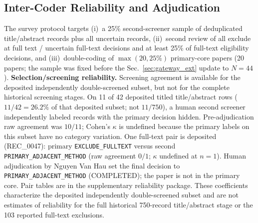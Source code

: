 \documentclass[lettersize,journal]{IEEEtran}
\begin{document}
\subsection{Inter-Coder Reliability and Adjudication}
\label{sec:icr}
The survey protocol targets (i)~a 25\% second-screener sample of deduplicated title/abstract records plus all uncertain records, (ii)~second review of all exclude at full text / uncertain full-text decisions and at least 25\% of full-text eligibility decisions, and (iii)~double-coding of $\max(20, 25\%)$ primary-core papers (20 papers; the sample was fixed before the Sec.~\ref{sec:gateway_ext} update to $N=44$).
\textbf{Selection/screening reliability.} Screening agreement is available for the deposited independently double-screened subset, but not for the complete historical screening stages. On 11 of 42 deposited titled title/abstract rows ($11/42=26.2\%$ of that deposited subset; not $11/750$), a human second screener independently labeled records with the primary decision hidden. Pre-adjudication raw agreement was $10/11$; Cohen's $\kappa$ is undefined because the primary labels on this subset have no category variation. One full-text pair is deposited (REC\_0047): primary \texttt{EXCLUDE\_FULLTEXT} versus second \texttt{PRIMARY\_ADJACENT\_METHOD} (raw agreement $0/1$; $\kappa$ undefined at $n=1$). Human adjudication by Nguyen Van Hau set the final decision to \texttt{PRIMARY\_ADJACENT\_METHOD} (COMPLETED); the paper is not in the primary core. Pair tables are in the supplementary reliability package. These coefficients characterize the deposited independently double-screened subset and are not estimates of reliability for the full historical 750-record title/abstract stage or the 103 reported full-text exclusions.
\end{document}
